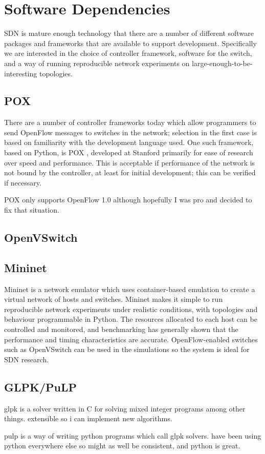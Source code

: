 \chapter{Software Dependencies}

SDN is mature enough technology that there are a number of different software packages and frameworks that are available to support development. Specifically we are interested in the choice of controller framework, software for the switch, and a way of running reproducible network experiments on large-enough-to-be-interesting topologies.

\section{POX}
There are a number of controller frameworks today which allow programmers to send OpenFlow messages to switches in the network; selection in the first case is based on familiarity with the development language used. One such framework, based on Python, is POX \cite{onl:pox}, developed at Stanford primarily for ease of research over speed and performance. This is acceptable if performance of the network is not bound by the controller, at least for initial development; this can be verified if necessary.

POX only supports OpenFlow 1.0 although hopefully I was pro and decided to fix that situation.

\section{OpenVSwitch}

\section{Mininet}
Mininet is a network emulator which uses container-based emulation \cite{handigol:mininet} to create a virtual network of hosts and switches. Mininet makes it simple to run reproducible network experiments under realistic conditions, with topologies and behaviour programmable in Python. The resources allocated to each host can be controlled and monitored, and benchmarking \cite{handigol:benchmarks} has generally shown that the performance and timing characteristics are accurate. OpenFlow-enabled switches such as OpenVSwitch can be used in the simulations so the system is ideal for SDN research.

\section{GLPK/PuLP}
glpk is a solver written in C for solving mixed integer programs among other things. extensible so i can implement new algorithms.

pulp is a way of writing python programs which call glpk solvers. have been using python everywhere else so might as well be consistent, and python is great.
